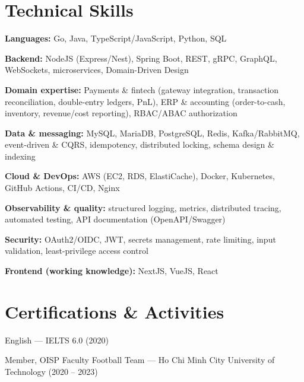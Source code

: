 \section{Technical Skills}
\begin{onecolentry}
\begin{highlights}
    \item \textbf{Languages:} Go, Java, TypeScript/JavaScript, Python, SQL
    \item \textbf{Backend:} NodeJS (Express/Nest), Spring Boot, REST, gRPC, GraphQL, WebSockets, microservices, Domain-Driven Design
    \item \textbf{Domain expertise:} Payments \& fintech (gateway integration, transaction reconciliation, double-entry ledgers, PnL), ERP \& accounting (order-to-cash, inventory, revenue/cost reporting), RBAC/ABAC authorization
    \item \textbf{Data \& messaging:} MySQL, MariaDB, PostgreSQL, Redis, Kafka/RabbitMQ, event-driven \& CQRS, idempotency, distributed locking, schema design \& indexing
    \item \textbf{Cloud \& DevOps:} AWS (EC2, RDS, ElastiCache), Docker, Kubernetes, GitHub Actions, CI/CD, Nginx
    \item \textbf{Observability \& quality:} structured logging, metrics, distributed tracing, automated testing, API documentation (OpenAPI/Swagger)
    \item \textbf{Security:} OAuth2/OIDC, JWT, secrets management, rate limiting, input validation, least-privilege access control
    \item \textbf{Frontend (working knowledge):} NextJS, VueJS, React
\end{highlights}
\end{onecolentry}


\section{Certifications \& Activities}
\begin{onecolentry}
    \begin{highlights}
        \item English — IELTS 6.0 (2020)
        \item Member, OISP Faculty Football Team — Ho Chi Minh City University of Technology (2020 -- 2023)
    \end{highlights}
\end{onecolentry}
